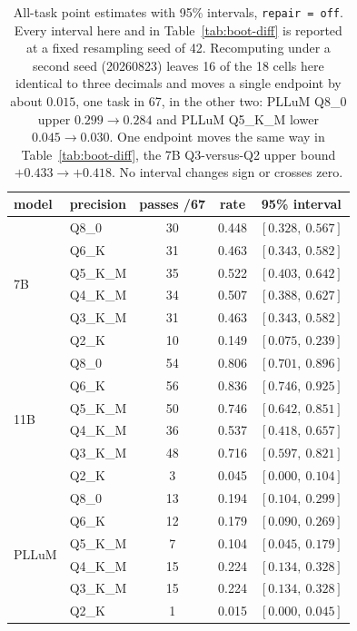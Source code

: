 \documentclass[11pt]{article}
\begin{document}
\begin{table}[h]
\centering\small
\caption{All-task point estimates with 95\% intervals, \texttt{repair\,=\,off}. Every interval here and in Table~\ref{tab:boot-diff} is reported at a fixed resampling seed of 42. Recomputing under a second seed (20260823) leaves 16 of the 18 cells here identical to three decimals and moves a single endpoint by about $0.015$, one task in 67, in the other two: PLLuM Q8\_0 upper $0.299 \to 0.284$ and PLLuM Q5\_K\_M lower $0.045 \to 0.030$. One endpoint moves the same way in Table~\ref{tab:boot-diff}, the 7B Q3-versus-Q2 upper bound $+0.433 \to +0.418$. No interval changes sign or crosses zero.}
\label{tab:boot-point}
\begin{tabular}{llccc}
\toprule
model & precision & passes /67 & rate & 95\% interval \\
\midrule
\multirow{6}{*}{7B}
 & Q8\_0   & 30 & 0.448 & $[0.328,\ 0.567]$ \\
 & Q6\_K   & 31 & 0.463 & $[0.343,\ 0.582]$ \\
 & Q5\_K\_M & 35 & 0.522 & $[0.403,\ 0.642]$ \\
 & Q4\_K\_M & 34 & 0.507 & $[0.388,\ 0.627]$ \\
 & Q3\_K\_M & 31 & 0.463 & $[0.343,\ 0.582]$ \\
 & Q2\_K   & 10 & 0.149 & $[0.075,\ 0.239]$ \\
\midrule
\multirow{6}{*}{11B}
 & Q8\_0   & 54 & 0.806 & $[0.701,\ 0.896]$ \\
 & Q6\_K   & 56 & 0.836 & $[0.746,\ 0.925]$ \\
 & Q5\_K\_M & 50 & 0.746 & $[0.642,\ 0.851]$ \\
 & Q4\_K\_M & 36 & 0.537 & $[0.418,\ 0.657]$ \\
 & Q3\_K\_M & 48 & 0.716 & $[0.597,\ 0.821]$ \\
 & Q2\_K   & 3  & 0.045 & $[0.000,\ 0.104]$ \\
\midrule
\multirow{6}{*}{PLLuM}
 & Q8\_0   & 13 & 0.194 & $[0.104,\ 0.299]$ \\
 & Q6\_K   & 12 & 0.179 & $[0.090,\ 0.269]$ \\
 & Q5\_K\_M & 7  & 0.104 & $[0.045,\ 0.179]$ \\
 & Q4\_K\_M & 15 & 0.224 & $[0.134,\ 0.328]$ \\
 & Q3\_K\_M & 15 & 0.224 & $[0.134,\ 0.328]$ \\
 & Q2\_K   & 1  & 0.015 & $[0.000,\ 0.045]$ \\
\bottomrule
\end{tabular}
\end{table}
\end{document}
